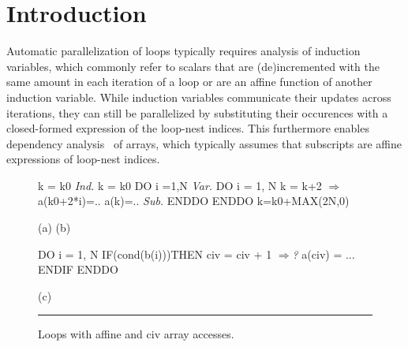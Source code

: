 \documentclass{sig-alternate}
\newcommand{\emp}[1]{\textcolor{DikuRed}{ #1}}
\newcommand{\emphh}[1]{\textcolor{CosGreen}{ #1}}
\newcommand{\mymath}[1]{$ #1 $}
\begin{document}





\section{Introduction}


\enlargethispage{\baselineskip}


Automatic parallelization of loops typically requires analysis of 
induction variables, which commonly refer to scalars that are 
(de)incremented with the same amount in each iteration of a loop or 
are an affine function of another induction variable. 
%
While induction variables communicate their updates across  %
iterations, they can still be parallelized by substituting their 
occurences with a closed-formed expression of the loop-nest indices. 
%
This furthermore enables dependency analysis~\cite{BanerjeeIneqTest,FeautrierDataflow,Pugh92theomega} 
of arrays, which typically assumes that subscripts are affine 
expressions of loop-nest indices.
% 

\begin{figure}
\begin{minipage}{0.58\columnwidth}
\begin{colorcode}
k = k0     \emphh{\em Ind.}  k = k0        
DO i =1,N  \emphh{\em Var.}  DO i = 1, N      
  k = k+2    \emphh{\mymath{\Rightarrow}}    a(k0+2*i)=.. 
  a(k)=..  \emphh{\em Sub.}  ENDDO         
ENDDO            k=k0+MAX(2N,0)

   (a)               (b) 

\end{colorcode}
\end{minipage}
\begin{minipage}{0.35\columnwidth}
\begin{colorcode}
DO i = 1, N
 IF(cond(b(i)))THEN 
    civ = civ + 1 \emp{\mymath{\Rightarrow}{\em ?}} 
    a(civ) = ...
ENDIF ENDDO

      (c)

\end{colorcode}
\end{minipage}
\hrule
\caption{Loops with affine and {\sc civ} array accesses.}
\label{fig:introEg}
\vspace{-2ex}
\end{figure}
\end{document}
